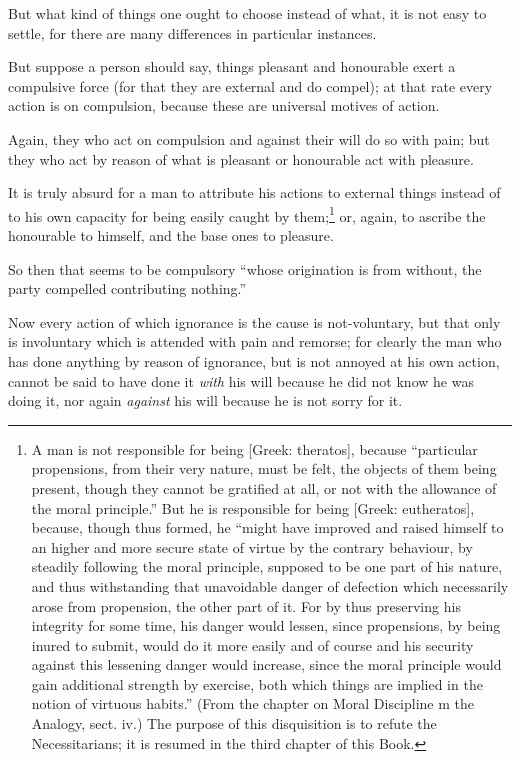 But what kind of things one ought to choose instead of what, it is not easy to
settle, for there are many differences in particular instances.

But suppose a person should say, things pleasant and honourable exert a
compulsive force (for that they are external and do compel); at that rate every
action is on compulsion, because these are universal motives of action.

Again, they who act on compulsion and against their will do so with pain; but
they who act by reason of what is pleasant or honourable act with pleasure.

It is truly absurd for a man to attribute his actions to external things
instead of to his own capacity for being easily caught by them;\footnote{A man is not responsible for being [Greek: theratos], because “particular
propensions, from their very nature, must be felt, the objects of them being
present, though they cannot be gratified at all, or not with the allowance of
the moral principle.” But he is responsible for being [Greek:
eutheratos], because, though thus formed, he “might have improved and
raised himself to an higher and more secure state of virtue by the contrary
behaviour, by steadily following the moral principle, supposed to be one part
of his nature, and thus withstanding that unavoidable danger of defection which
necessarily arose from propension, the other part of it. For by thus preserving
his integrity for some time, his danger would lessen, since propensions, by
being inured to submit, would do it more easily and of course and his security
against this lessening danger would increase, since the moral principle would
gain additional strength by exercise, both which things are implied in the
notion of virtuous habits.” (From the chapter on Moral Discipline m the
Analogy, sect. iv.) The purpose of this disquisition is to refute the
Necessitarians; it is resumed in the third chapter of this Book.}
or, again, to ascribe the honourable to himself, and the base ones to pleasure.

So then that seems to be compulsory “whose origination is from without,
the party compelled contributing nothing.”


Now every action of which ignorance is the cause is not-voluntary, but that
only is involuntary which is attended with pain and remorse; for clearly the
man who has done anything by reason of ignorance, but is not annoyed at his own
action, cannot be said to have done it \emph{with} his will because he did not
know he was doing it, nor again \emph{against} his will because he is not sorry
for it.

